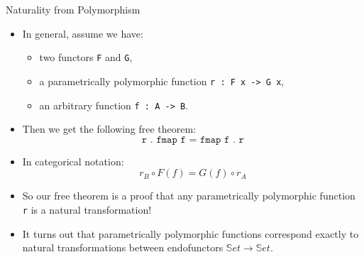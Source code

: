\documentclass[aspectratio=169]{beamer} %
\newcommand{\bS}{\mathbb{S}}
\begin{document}
{\begin{frame}{Naturality from Polymorphism}
\begin{itemize}
      \item In general, assume we have:
      \begin{itemize}
        \item two functors \texttt{F} and \texttt{G},
        \item a parametrically polymorphic function \texttt{r : F x -> G x},
        \item an arbitrary function \texttt{f : A -> B}.
      \end{itemize}
      \pause\item Then we get the following free theorem:
      \begin{equation*}
       \texttt{r . fmap f = fmap f . r}
      \end{equation*}
      \vspace{-18pt}
      \pause\item In categorical notation:
      \begin{equation*}
        r_B \circ F(f) = G(f) \circ r_A
      \end{equation*}
      \vspace{-18pt}
      \pause\item So our free theorem is a proof that any parametrically polymorphic function \texttt{r} is a natural transformation!
      \pause\item It turns out that parametrically polymorphic functions correspond exactly to natural transformations between endofunctors $\bS et \to \bS et$.
    \end{itemize}
\end{frame}

}
\end{document}
